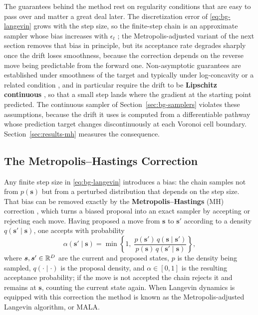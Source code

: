 The guarantees behind the method rest on regularity conditions that are easy to pass over and matter a great deal later. The discretization error of \eqref{eq:bg-langevin} grows with the step size, so the finite-step chain is an approximate sampler whose bias increases with $\epsilon_t$ \citep{roberts1996exponential}; the Metropolis-adjusted variant of the next section removes that bias in principle, but its acceptance rate degrades sharply once the drift loses smoothness, because the correction depends on the reverse move being predictable from the forward one. Non-asymptotic guarantees are established under smoothness of the target and typically under log-concavity or a related condition \citep{dalalyan2017theoretical, durmus2017nonasymptotic}, and in particular require the drift to be \textbf{Lipschitz continuous} \citep{roberts1996exponential}, so that a small step lands where the gradient at the starting point predicted. The continuous sampler of Section~\ref{sec:bg-samplers} violates these assumptions, because the drift it uses is computed from a differentiable pathway whose prediction target changes discontinuously at each Voronoi cell boundary. Section~\ref{sec:results-mh} measures the consequence.

\subsection{The Metropolis--Hastings Correction}
\label{sec:bg-mh}

Any finite step size in \eqref{eq:bg-langevin} introduces a bias: the chain samples not from $p(\bm{s})$ but from a perturbed distribution that depends on the step size. That bias can be removed exactly by the \textbf{Metropolis--Hastings} (MH) correction \citep{metropolis1953equation, hastings1970monte}, which turns a biased proposal into an exact sampler by accepting or rejecting each move. Having proposed a move from $\bm{s}$ to $\bm{s}'$ according to a density $q(\bm{s}' \mid \bm{s})$, one accepts with probability
\begin{equation}
    \alpha(\bm{s}' \mid \bm{s}) = \min\left\{ 1,\; \frac{p(\bm{s}')\, q(\bm{s} \mid \bm{s}')}{p(\bm{s})\, q(\bm{s}' \mid \bm{s})} \right\},
    \label{eq:bg-mh}
\end{equation}
where $\bm{s}, \bm{s}' \in \mathbb{R}^D$ are the current and proposed states, $p$ is the density being sampled, $q(\cdot \mid \cdot)$ is the proposal density, and $\alpha \in [0,1]$ is the resulting acceptance probability; if the move is not accepted the chain rejects it and remains at $\bm{s}$, counting the current state again. When Langevin dynamics is equipped with this correction the method is known as the Metropolis-adjusted Langevin algorithm, or MALA.

